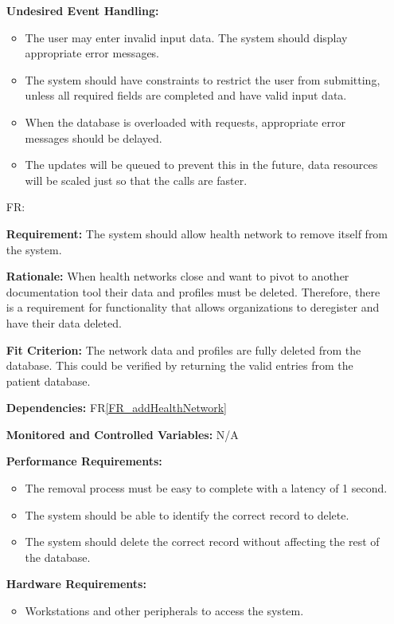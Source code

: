 \documentclass[12pt]{article}
\newcounter{reqnum} %
\begin{document}
\begin{itemize}
  \textbf{Undesired Event Handling:} 
  \begin{itemize}
    \item The user may enter invalid input data. The system should display appropriate error messages. 
    \item The system should have constraints to restrict the user from submitting, unless all required fields are completed and have valid input data. 
    \item When the database is overloaded with requests, appropriate error messages should be delayed. 
    \item The updates will be queued to prevent this in the future, data resources will be scaled just so that the calls are faster.
  \end{itemize}
  
  
  \item[FR\refstepcounter{reqnum}\thereqnum \label{FR_removeHealthNetwork}:]  
  
  \textbf{Requirement:} The system should allow health network to remove itself from the system.
  
  \textbf{Rationale:} 
  When health networks close and want to pivot to another documentation tool their data and profiles must be deleted. Therefore, there is a requirement for functionality that allows organizations to deregister and have their data deleted.
  
  \textbf{Fit Criterion:} 
  The network data and profiles are fully deleted from the database. This could be verified by returning the valid entries from the patient database.
  
  \textbf{Dependencies:} FR\ref{FR_addHealthNetwork} 
  
  \textbf{Monitored and Controlled Variables:} N/A
  
  \textbf{Performance Requirements:} 
  \begin{itemize}
    \item The removal process must be easy to complete with a latency of 1 second. 
    \item The system should be able to identify the correct record to delete. 
    \item The system should delete the correct record without affecting the rest of the database. 
  \end{itemize}
  
  \textbf{Hardware Requirements:} 
  \begin{itemize}
    \item Workstations and other peripherals to access the system.
  \end{itemize}
  

\end{itemize}
\end{document}
